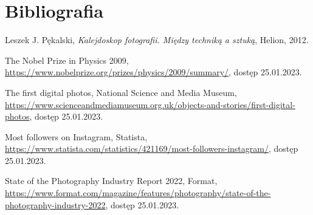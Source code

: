 \documentclass[12pt]{article}
\numberwithin{figure}{section}
\begin{document}
\begin{sloppypar}

%
    \listoftables
    \clearpage


%
    \listofcodes
    \clearpage


\section*{Bibliografia}
    \renewcommand{\section}[2]{}
    
\begin{thebibliography}{99}

    Leszek J. Pękalski,
    \textit{Kalejdoskop fotografii. Między techniką a sztuką},
    Helion,
    2012.

    The Nobel Prize in Physics 2009,
    \url{https://www.nobelprize.org/prizes/physics/2009/summary/}, 
    dostęp 25.01.2023.

    The first digital photos, National Science and Media Museum,
    \url{https://www.scienceandmediamuseum.org.uk/objects-and-stories/first-digital-photos},
    dostęp 25.01.2023.

    Most followers on Instagram, Statista,
    \url{https://www.statista.com/statistics/421169/most-followers-instagram/},
    dostęp 25.01.2023.

    State of the Photography Industry Report 2022, Format,
    \url{https://www.format.com/magazine/features/photography/state-of-the-photography-industry-2022},
    dostęp 25.01.2023.
        
\end{thebibliography}

\end{sloppypar}
\end{document}
